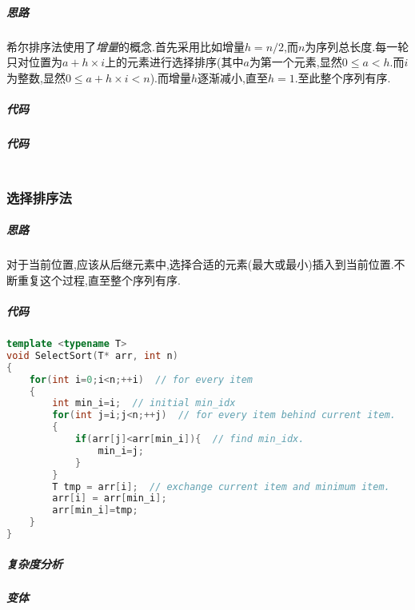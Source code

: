 \documentclass{ctexart}
\begin{document}
	\subparagraph{思路}
	希尔排序法使用了\emph{增量}的概念.首先采用比如增量$h=n/2$,而$n$为序列总长度.每一轮只对位置为$a+h\times i$上的元素进行选择排序(其中$a$为第一个元素,显然$0\leq a < h$.而$i$为整数,显然$0 \leq a+h\times i< n$).而增量$h$逐渐减小,直至$h=1$.至此整个序列有序.
	\subparagraph{代码}

\subparagraph{代码}
\begin{lstlisting}[language = C++, title=insert sort, frame=shadowbox, breaklines=true]	
\end{lstlisting}

\subsubsection{选择排序法}
\subparagraph{思路}
对于当前位置,应该从后继元素中,选择合适的元素(最大或最小)插入到当前位置.不断重复这个过程,直至整个序列有序.

\subparagraph{代码}
\begin{lstlisting}[language = C++, title=select sort, frame=shadowbox, breaklines=true]
template <typename T>
void SelectSort(T* arr, int n)
{
    for(int i=0;i<n;++i)  // for every item
    {
        int min_i=i;  // initial min_idx
        for(int j=i;j<n;++j)  // for every item behind current item.
        {
            if(arr[j]<arr[min_i]){  // find min_idx.
                min_i=j;
            }
        }
        T tmp = arr[i];  // exchange current item and minimum item.
        arr[i] = arr[min_i];
        arr[min_i]=tmp;
    }
}	
\end{lstlisting}
\subparagraph{复杂度分析}
\subparagraph{变体}



%
%
	
\end{document}
